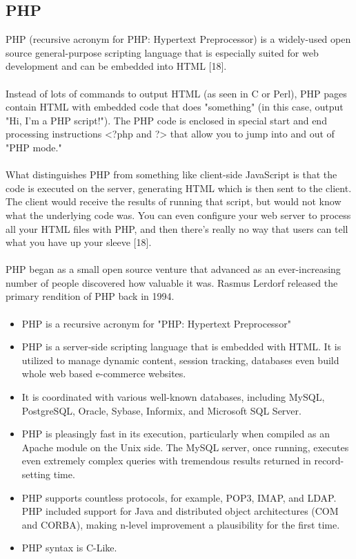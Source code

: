 \documentclass[../thesis.tex]{subfiles}
\begin{document}
\subsection{PHP}
PHP (recursive acronym for PHP: Hypertext Preprocessor) is a widely-used open source general-purpose scripting language that is especially suited for web development and can be embedded into HTML [18].
\paragraph{}
Instead of lots of commands to output HTML (as seen in C or Perl), PHP pages contain HTML with embedded code that does "something" (in this case, output "Hi, I'm a PHP script!"). The PHP code is enclosed in special start and end processing instructions <?php and ?> that allow you to jump into and out of "PHP mode."
\paragraph{}
What distinguishes PHP from something like client-side JavaScript is that the code is executed on the server, generating HTML which is then sent to the client. The client would receive the results of running that script, but would not know what the underlying code was. You can even configure your web server to process all your HTML files with PHP, and then there's really no way that users can tell what you have up your sleeve [18].
\paragraph{}
PHP began as a small open source venture that advanced as an ever-increasing number of people discovered how valuable it was. Rasmus Lerdorf released the primary rendition of PHP back in 1994.
\paragraph{}
\begin{itemize}
  \item PHP is a recursive acronym for "PHP: Hypertext Preprocessor"
  \item PHP is a server-side scripting language that is embedded with HTML. It is utilized to manage dynamic content, session tracking, databases even build whole web based e-commerce websites. 
  \item It is coordinated with various well-known databases, including MySQL, PostgreSQL, Oracle, Sybase, Informix, and Microsoft SQL Server. 
  \item PHP is pleasingly fast in its execution, particularly when compiled as an Apache module on the Unix side. The MySQL server, once running, executes even extremely complex queries with tremendous results returned in record-setting time. 
  \item PHP supports countless protocols, for example, POP3, IMAP, and LDAP. PHP included support for Java and distributed object architectures (COM and CORBA), making n-level improvement a plausibility for the first time. 
  \item PHP syntax is C-Like.  
\end{itemize}
\end{document}
